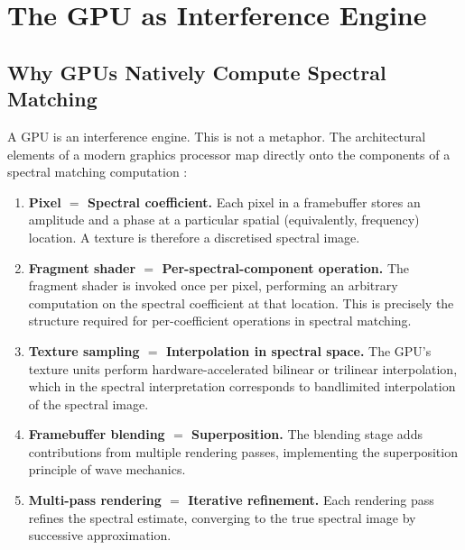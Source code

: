 \documentclass[11pt,twocolumn,a4paper]{article}
\theoremstyle{definition}
\theoremstyle{remark}
\begin{document}
\section{The GPU as Interference Engine}\label{sec:gpu}

\subsection{Why GPUs Natively Compute Spectral Matching}

A GPU is an interference engine.  This is not a metaphor.  The architectural elements of a modern graphics processor map directly onto the components of a spectral matching computation \citep{owens2008gpu}:

\begin{enumerate}[label=(\roman*)]
    \item \textbf{Pixel $=$ Spectral coefficient.}  Each pixel in a framebuffer stores an amplitude and a phase at a particular spatial (equivalently, frequency) location.  A texture is therefore a discretised spectral image.

    \item \textbf{Fragment shader $=$ Per-spectral-component operation.}  The fragment shader is invoked once per pixel, performing an arbitrary computation on the spectral coefficient at that location.  This is precisely the structure required for per-coefficient operations in spectral matching.

    \item \textbf{Texture sampling $=$ Interpolation in spectral space.}  The GPU's texture units perform hardware-accelerated bilinear or trilinear interpolation, which in the spectral interpretation corresponds to bandlimited interpolation of the spectral image.

    \item \textbf{Framebuffer blending $=$ Superposition.}  The blending stage adds contributions from multiple rendering passes, implementing the superposition principle of wave mechanics.

    \item \textbf{Multi-pass rendering $=$ Iterative refinement.}  Each rendering pass refines the spectral estimate, converging to the true spectral image by successive approximation.
\end{enumerate}
\end{document}
